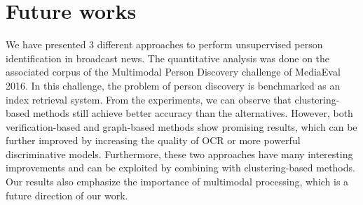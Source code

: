 \section{Future works}
\label{sec:discuss}

We have presented 3 different approaches to perform unsupervised person identification in broadcast news. The quantitative analysis was done on the associated corpus of the Multimodal Person Discovery challenge of MediaEval 2016. In this challenge, the problem of person discovery is benchmarked as an index retrieval system.
%
From the experiments, we can observe that clustering-based methods still achieve better accuracy than the alternatives. However, both verification-based and graph-based methods show promising results, which can be further improved by increasing the quality of OCR or more powerful discriminative models. 
%
Furthermore, these two approaches have many interesting improvements and can be exploited by combining with clustering-based methods.
%
Our results also emphasize the importance of multimodal processing, which is a future direction of our work.


\endinput
